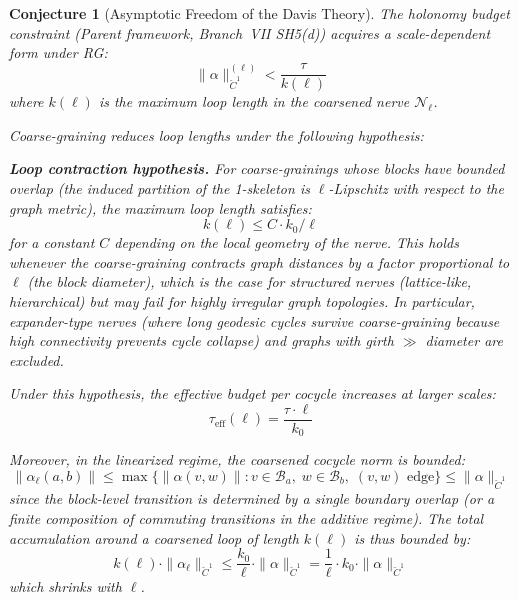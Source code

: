 \documentclass[11pt,letterpaper]{article}
\newtheorem{conjecture}{Conjecture}[section]
\newcommand{\Cech}{\check{C}}
\newcommand{\nerve}{\mathcal{N}}
\newcommand{\block}{\mathcal{B}}
\begin{document}
\begin{conjecture}[Asymptotic Freedom of the Davis 
Theory]\label{conj:asymptotic_freedom}
The holonomy budget constraint (Parent framework, Branch~VII SH5(d)) 
acquires a scale-dependent form under RG:
\begin{equation}\label{eq:holonomy_budget_rg}
    \|\alpha\|_{\Cech^1}^{(\ell)} < \frac{\tau}{k(\ell)}
\end{equation}
where $k(\ell)$ is the maximum loop length in the coarsened nerve 
$\nerve_\ell$.

Coarse-graining reduces loop lengths under the following 
hypothesis:

\textbf{Loop contraction hypothesis.} For coarse-grainings whose 
blocks have bounded overlap (the induced partition of the 
1-skeleton is $\ell$-Lipschitz with respect to the graph metric), 
the maximum loop length satisfies:
\begin{equation}\label{eq:loop_contraction}
    k(\ell) \leq C \cdot k_0 / \ell
\end{equation}
for a constant $C$ depending on the local geometry of the nerve. 
This holds whenever the coarse-graining contracts graph distances 
by a factor proportional to $\ell$ (the block diameter), which is 
the case for structured nerves (lattice-like, hierarchical) but may 
fail for highly irregular graph topologies. In particular, 
expander-type nerves (where long geodesic cycles survive 
coarse-graining because high connectivity prevents cycle collapse) 
and graphs with girth $\gg$ diameter are excluded.

Under this hypothesis, the 
effective budget per cocycle \emph{increases} at larger 
scales:
\begin{equation}\label{eq:tau_eff}
    \tau_{\mathrm{eff}}(\ell) 
    = \frac{\tau \cdot \ell}{k_0}
\end{equation}

Moreover, in the linearized regime, the coarsened cocycle norm is 
bounded:
\begin{equation}\label{eq:cocycle_bound}
    \|\alpha_\ell(a, b)\| \leq \max\{\|\alpha(v, w)\| 
    : v \in \block_a,\; w \in \block_b,\; (v, w) \text{ edge}\} 
    \leq \|\alpha\|_{\Cech^1}
\end{equation}
since the block-level transition is determined by a single 
boundary overlap (or a finite composition of commuting transitions 
in the additive regime). The total accumulation around a coarsened 
loop of length $k(\ell)$ is thus bounded by:
\begin{equation}\label{eq:total_accumulation}
    k(\ell) \cdot \|\alpha_\ell\|_{\Cech^1} 
    \leq \frac{k_0}{\ell} \cdot \|\alpha\|_{\Cech^1} 
    = \frac{1}{\ell} \cdot k_0 \cdot \|\alpha\|_{\Cech^1}
\end{equation}
which shrinks with $\ell$.


\end{conjecture}
\end{document}
